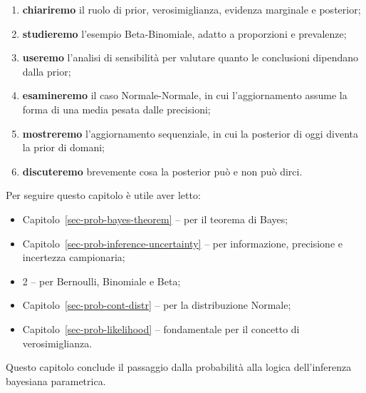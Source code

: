 \documentclass[
  italian,
  letterpaper,
  a4paper,
  11pt,
  open=any]{scrbook}
\providecommand{\tightlist}{%
  \setlength{\itemsep}{0pt}\setlength{\parskip}{0pt}}
\theoremstyle{plain}
\theoremstyle{definition}
\theoremstyle{definition}
\theoremstyle{remark}
\begin{document}
\begin{enumerate}
\def\labelenumi{\arabic{enumi}.}
\tightlist
\item
  \textbf{chiariremo} il ruolo di prior, verosimiglianza, evidenza
  marginale e posterior;
\item
  \textbf{studieremo} l'esempio Beta-Binomiale, adatto a proporzioni e
  prevalenze;
\item
  \textbf{useremo} l'analisi di sensibilità per valutare quanto le
  conclusioni dipendano dalla prior;
\item
  \textbf{esamineremo} il caso Normale-Normale, in cui l'aggiornamento
  assume la forma di una media pesata dalle precisioni;
\item
  \textbf{mostreremo} l'aggiornamento sequenziale, in cui la posterior
  di oggi diventa la prior di domani;
\item
  \textbf{discuteremo} brevemente cosa la posterior può e non può dirci.
\end{enumerate}

\begin{tcolorbox}[enhanced jigsaw, arc=.35mm, bottomrule=.15mm, bottomtitle=1mm, breakable, colback=white, colbacktitle=quarto-callout-tip-color!10!white, colframe=quarto-callout-tip-color-frame, coltitle=black, left=2mm, leftrule=.75mm, opacityback=0, opacitybacktitle=0.6, rightrule=.15mm, title=\textcolor{quarto-callout-tip-color}{\faLightbulb}\hspace{0.5em}{Prerequisiti}, titlerule=0mm, toprule=.15mm, toptitle=1mm]

Per seguire questo capitolo è utile aver letto:

\begin{itemize}
\tightlist
\item
  Capitolo~\ref{sec-prob-bayes-theorem} -- per il teorema di Bayes;
\item
  Capitolo~\ref{sec-prob-inference-uncertainty} -- per informazione,
  precisione e incertezza campionaria;
\item
  2 -- per Bernoulli, Binomiale e Beta;
\item
  Capitolo~\ref{sec-prob-cont-distr} -- per la distribuzione Normale;
\item
  Capitolo~\ref{sec-prob-likelihood} -- fondamentale per il concetto di
  verosimiglianza.
\end{itemize}

Questo capitolo conclude il passaggio dalla probabilità alla logica
dell'inferenza bayesiana parametrica.

\end{tcolorbox}
\end{document}
